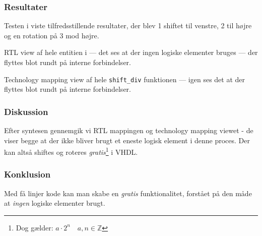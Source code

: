 \subsubsection{Resultater}
Testen i  viste tilfredsstillende resultater, der blev 1 shiftet til venstre, 2 til højre og en rotation på 3 mod højre.

{RTL view af hele entitien i  --- det ses at der ingen logiske elementer bruges --- der flyttes blot rundt på interne forbindelser.}


{Technology mapping view af hele \texttt{shift\_div} funktionen --- igen ses det at der flyttes blot rundt på interne forbindelser.}




\subsubsection{Diskussion}
Efter syntesen gennemgik vi RTL mappingen og technology mapping viewet - de viser begge at der ikke bliver brugt et eneste logisk element i denne proces. Der kan altså shiftes og roteres \emph{gratis}\footnote{Dog gælder: $a\cdot 2^n \quad a, n \in \mathbb{Z}$} i VHDL.

\subsubsection{Konklusion}

Med få linjer kode kan man skabe en \emph{gratis} funktionalitet, forstået på den måde at \textit{ingen} logiske elementer brugt.


